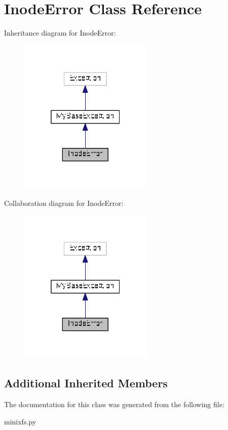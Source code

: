 \hypertarget{classminixfs_1_1_inode_error}{}\section{Inode\+Error Class Reference}
\label{classminixfs_1_1_inode_error}


Inheritance diagram for Inode\+Error\+:
\nopagebreak
\begin{figure}[H]
\begin{center}
\leavevmode
\includegraphics[width=181pt]{classminixfs_1_1_inode_error__inherit__graph}
\end{center}
\end{figure}


Collaboration diagram for Inode\+Error\+:
\nopagebreak
\begin{figure}[H]
\begin{center}
\leavevmode
\includegraphics[width=181pt]{classminixfs_1_1_inode_error__coll__graph}
\end{center}
\end{figure}
\subsection*{Additional Inherited Members}


The documentation for this class was generated from the following file\+:\begin{DoxyCompactItemize}
\item 
minixfs.\+py\end{DoxyCompactItemize}
